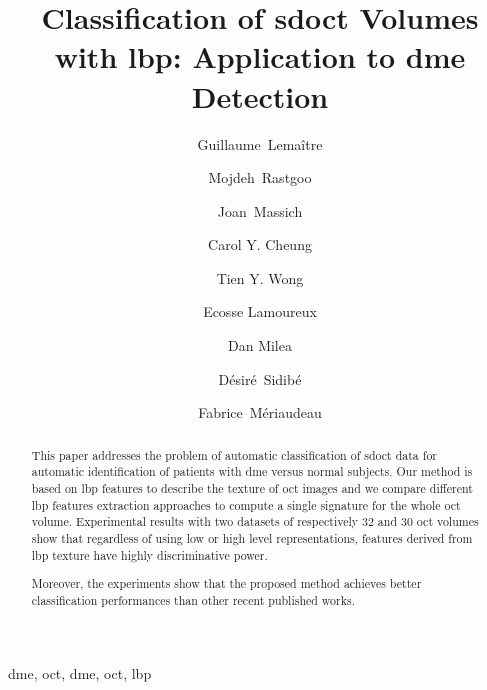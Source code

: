 \title{Classification of \acs*{sdoct} Volumes with \acs*{lbp}: Application to \acs*{dme} Detection}


\author[le2i,vicorob]{Guillaume~Lema\^itre}
\author[le2i,vicorob]{Mojdeh~Rastgoo}
\author[le2i]{Joan~Massich}
\author[seri]{Carol Y. Cheung}
\author[seri]{Tien Y. Wong}
\author[seri]{Ecosse Lamoureux}
\author[seri]{Dan Milea}
\author[le2i]{D\'esir\'e~Sidib\'e}
\author[le2i]{Fabrice~M\'eriaudeau}

\address[le2i]{ViCOROB, Universitat de Girona, Campus Montilivi, Edifici P4, 17071 Girona, Spain}
\address[vicorob]{LE2I UMR6306, CNRS, Arts et M\'etiers, Univ. Bourgogne Franche-Comt\'e, 12 rue de la Fonderie, 71200 Le Creusot, France}
\address[seri]{Singaore Eye Research Institute, Singapore National Eye Center, Singapore}
\begin{abstract}
\acresetall  %
This paper addresses the problem of automatic classification of \ac{sdoct} data for automatic identification of patients with \ac{dme} versus normal subjects.
Our method is based on \ac{lbp} features to describe the texture of \ac{oct} images and we compare different \ac{lbp} features extraction approaches to compute a single signature for the whole \ac{oct} volume.
Experimental results with two datasets of respectively 32 and 30 \ac{oct} volumes show that
regardless of using low or high level representations, features derived from \ac{lbp} texture have highly discriminative power.%

Moreover, the experiments show that the proposed method achieves better classification performances than other recent published works.
\end{abstract}

\begin{keyword}
\acl{dme}, \acl{oct}, \acs{dme}, \acs{oct}, \ac{lbp}
\end{keyword}
